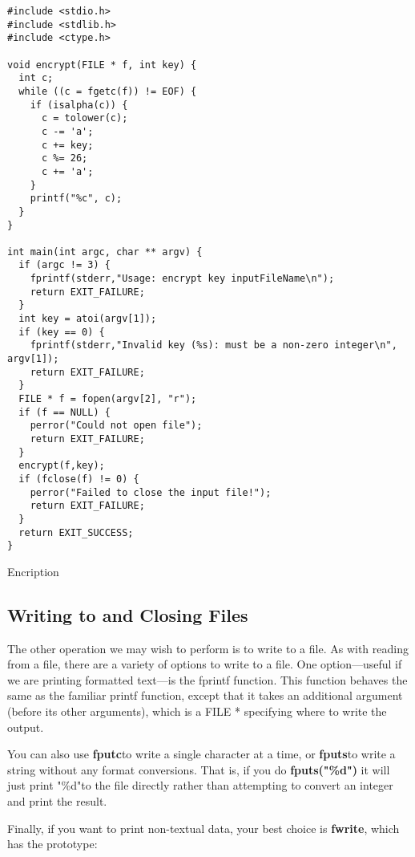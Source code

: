\documentclass[11pt, a4paper]{article}
\begin{document}
\begin{listing}
\begin{verbatim}
#include <stdio.h>
#include <stdlib.h>
#include <ctype.h>

void encrypt(FILE * f, int key) {    
  int c;    
  while ((c = fgetc(f)) != EOF) {        
    if (isalpha(c)) {            
      c = tolower(c);            
      c -= 'a';            
      c += key;            
      c %= 26;            
      c += 'a';        
    }        
    printf("%c", c);    
  }
}

int main(int argc, char ** argv) {  
  if (argc != 3) {    
    fprintf(stderr,"Usage: encrypt key inputFileName\n");    
    return EXIT_FAILURE;  
  }  
  int key = atoi(argv[1]);  
  if (key == 0) {    
    fprintf(stderr,"Invalid key (%s): must be a non-zero integer\n", argv[1]);    
    return EXIT_FAILURE;  
  }  
  FILE * f = fopen(argv[2], "r");  
  if (f == NULL) {    
    perror("Could not open file");    
    return EXIT_FAILURE;  
  }  
  encrypt(f,key);  
  if (fclose(f) != 0) {    
    perror("Failed to close the input file!");    
    return EXIT_FAILURE;  
  }  
  return EXIT_SUCCESS;
}
\end{verbatim}
\caption{Encription}
\label{lst:encription}
\end{listing}



\subsection{Writing to and Closing Files}%
\label{sub:writing_to_and_closing_files}


The other operation we may wish to perform is to write to a file. As with reading from a file, there are a variety of options to write to a file. One option—useful if we are printing formatted text—is the fprintf function. This function behaves the same as the familiar printf function, except that it takes an additional argument (before its other arguments), which is a FILE * specifying where to write the output.



You can also use \textbf{fputc}to write a single character at a time, or \textbf{fputs}to write a string without any format conversions. That is, if you do \textbf{fputs("\%d")} it will just print "\%d"to the file directly rather than attempting to convert an integer and print the result.


Finally, if you want to print non-textual data, your best choice is \textbf{fwrite}, which has the prototype:
\end{document}
